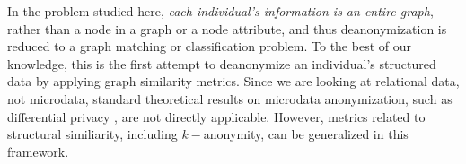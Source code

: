 In the problem studied here, \emph{each individual's information is an entire graph}, rather than a node in a graph or a node attribute, and thus deanonymization is reduced to a graph matching or classification problem.
To the best of our knowledge, this is the first attempt to deanonymize an individual's structured data by applying graph similarity metrics.
Since we are looking at relational data, not microdata, standard theoretical results on microdata anonymization, such as differential privacy \cite{dwork2006calibrating}, are not directly applicable.
However, metrics related to structural similiarity, including $k-$anonymity, can be generalized in this framework.
